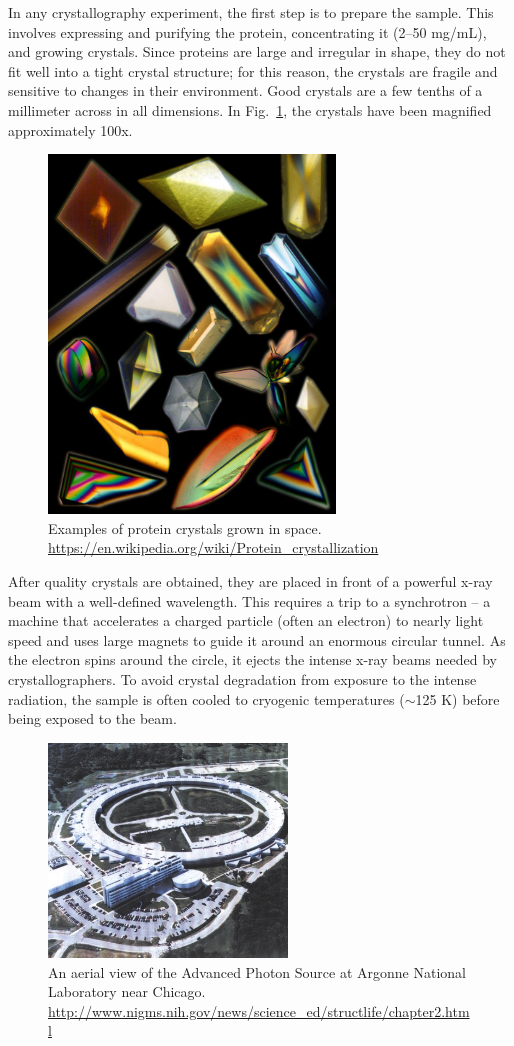 In any crystallography experiment, the first step is to prepare the sample.  This involves expressing and purifying the protein, concentrating it (2--50 mg/mL), and growing crystals.  Since proteins are large and irregular in shape, they do not fit well into a tight crystal structure; for this reason, the crystals are fragile and sensitive to changes in their environment.  Good crystals are a few tenths of a millimeter across in all dimensions. In Fig.~\ref{Fig9-2}, the crystals have been magnified approximately 100x.
\begin{figure}[h]
	\centering
	\includegraphics[width=3.0in]{./figures/Topic9/Fig9-2a.jpg}
	\caption{Examples of protein crystals grown in space. \href{https://en.wikipedia.org/wiki/Protein\_crystallizationl}{https://en.wikipedia.org/wiki/Protein\_crystallization}}
 	\label{Fig9-2}
\end{figure}
After quality crystals are obtained, they are placed in front of a powerful x-ray beam with a well-defined wavelength.  This requires a trip to a synchrotron -- a machine that accelerates a charged particle (often an electron) to nearly light speed and uses large magnets to guide it around an enormous circular tunnel.  As the electron spins around the circle, it ejects the intense x-ray beams needed by crystallographers.  To avoid crystal degradation from exposure to the intense radiation, the sample is often cooled to cryogenic temperatures ($\sim$125 K) before being exposed to the beam.
\begin{figure}[h]
	\centering
	\includegraphics[width=2.5in]{./figures/Topic9/Fig9-3.jpg}
	\caption{An aerial view of the Advanced Photon Source at Argonne National Laboratory near Chicago. \href{http://www.nigms.nih.gov/news/science\_ed/structlife/chapter2.html}{http://www.nigms.nih.gov/news/science\_ed/structlife/chapter2.html}}
 	\label{Fig9-3}
\end{figure}

